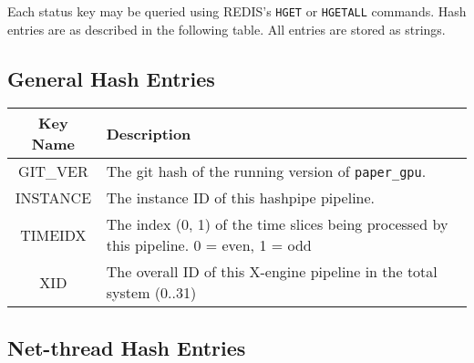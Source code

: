 \documentclass{article}
\begin{document}
Each status key may be queried using REDIS's \texttt{HGET} or \texttt{HGETALL} commands. Hash entries are as described in the following table. All entries are stored as strings.
\\
\subsection{General Hash Entries}

\begin{centering}
\begin{tabular}{c p{}}
\hline
Key Name & Description \\
\hline
\hline
GIT\_VER & The git hash of the running version of \texttt{paper\_gpu}. \\
INSTANCE & The instance ID of this hashpipe pipeline. \\
TIMEIDX  & The index (0, 1) of the time slices being processed by this pipeline. 0 = even, 1 = odd \\
XID      & The overall ID of this X-engine pipeline in the total system (0..31) \\
\end{tabular}
\end{centering}

\subsection{Net-thread Hash Entries}
\end{document}
